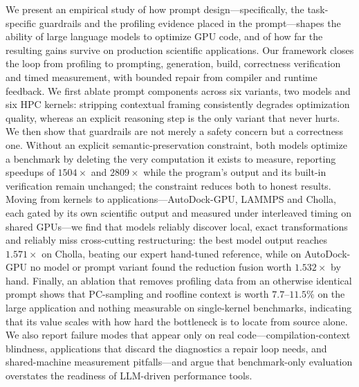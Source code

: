 We present an empirical study of how prompt design---specifically, the task-specific guardrails and the
profiling evidence placed in the prompt---shapes the ability of large language models to optimize GPU
code, and of how far the resulting gains survive on production scientific applications. Our framework
closes the loop from profiling to prompting, generation, build, correctness verification and timed
measurement, with bounded repair from compiler and runtime feedback. We first ablate prompt components
across six variants, two models and six HPC kernels: stripping contextual framing consistently degrades
optimization quality, whereas an explicit reasoning step is the only variant that never hurts. We then
show that guardrails are not merely a safety concern but a correctness one. Without an explicit
semantic-preservation constraint, both models optimize a benchmark by deleting the very computation it
exists to measure, reporting speedups of $1504\times$ and $2809\times$ while the program's output and
its built-in verification remain unchanged; the constraint reduces both to honest results. Moving from
kernels to applications---AutoDock-GPU, LAMMPS and Cholla, each gated by its own scientific output and
measured under interleaved timing on shared GPUs---we find that models reliably discover local, exact
transformations and reliably miss cross-cutting restructuring: the best model output reaches
$1.571\times$ on Cholla, beating our expert hand-tuned reference, while on AutoDock-GPU no model or
prompt variant found the reduction fusion worth $1.532\times$ by hand. Finally, an ablation that removes
profiling data from an otherwise identical prompt shows that PC-sampling and roofline context is worth
$7.7$--$11.5\%$ on the large application and nothing measurable on single-kernel benchmarks, indicating
that its value scales with how hard the bottleneck is to locate from source alone. We also report
failure modes that appear only on real code---compilation-context blindness, applications that discard
the diagnostics a repair loop needs, and shared-machine measurement pitfalls---and argue that
benchmark-only evaluation overstates the readiness of LLM-driven performance tools.

